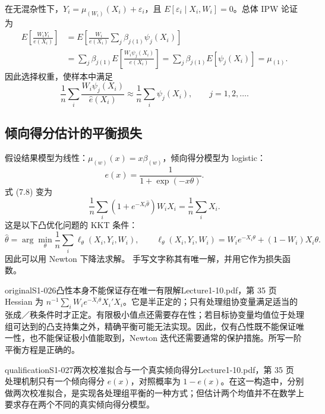 在无混杂性下，$Y_i=\mu_{(W_i)}(X_i)+\varepsilon_i$，且 $E[\varepsilon_i\mid X_i,W_i]=0$。总体 IPW 论证为
\begin{align*}
E\left[\frac{W_iY_i}{e(X_i)}\right]
&=E\left[\frac{W_i}{e(X_i)}\sum_j\beta_{j(1)}\psi_j(X_i)\right]\\
&=\sum_j\beta_{j(1)}E\left[\frac{W_i\psi_j(X_i)}{e(X_i)}\right]
=\sum_j\beta_{j(1)}E[\psi_j(X_i)]=\mu_{(1)}.
\end{align*}
因此选择权重，使样本中满足
\[
\frac1n\sum_i\frac{W_i\psi_j(X_i)}{\widehat e(X_i)}
\approx\frac1n\sum_i\psi_j(X_i),\qquad j=1,2,\ldots.
\tag{原笔记 7.8}
\]
\subsection{倾向得分估计的平衡损失}
假设结果模型为线性：$\mu_{(w)}(x)=x\beta_{(w)}$，倾向得分模型为 logistic：
\[
e(x)=\frac1{1+\exp(-x\theta)}.
\]
式 (7.8) 变为
\[
\frac1n\sum_i(1+e^{-X_i\widehat\theta})W_iX_i=\frac1n\sum_iX_i.
\tag{原笔记 7.9}
\]
这是以下凸优化问题的 KKT 条件：
\[
\widehat\theta=\arg\min_\theta\frac1n\sum_i\ell_\theta(X_i,Y_i,W_i),\qquad
\ell_\theta(X_i,Y_i,W_i)=W_ie^{-X_i\theta}+(1-W_i)X_i\theta.
\tag{原笔记 7.10}
\]
因此可以用 Newton 下降法求解。
手写文字称其有唯一解，并用它作为损失函数。
\begin{reviewnote}{original}{S1-026}{凸性本身不能保证存在唯一有限解}{Lecture1-10.pdf，第 35 页}
Hessian 为 $n^{-1}\sum_iW_i e^{-X_i\theta}X_i'X_i$。它是半正定的；只有处理组协变量满足适当的张成／秩条件时才正定。有限极小值点还需要存在性；若目标协变量均值位于处理组可达到的凸支持集之外，精确平衡可能无法实现。因此，仅有凸性既不能保证唯一性，也不能保证极小值能取到，Newton 迭代还需要通常的保护措施。所写一阶平衡方程是正确的。
\end{reviewnote}
\begin{reviewnote}{qualification}{S1-027}{两次校准拟合与一个真实倾向得分}{Lecture1-10.pdf，第 35 页}
处理机制只有一个倾向得分 $e(x)$，对照概率为 $1-e(x)$。在这一构造中，分别做两次校准拟合，是实现各处理组平衡的一种方式；但估计两个均值并不在数学上要求存在两个不同的真实倾向得分模型。
\end{reviewnote}

